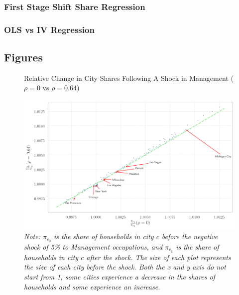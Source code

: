 \documentclass[10pt]{article}
\begin{document}
\subsubsection{First Stage Shift Share Regression}


\newpage

\subsubsection{OLS vs IV Regression}


\newpage

\subsection{Figures}

\begin{figure}[!htb]
    \centering
    \caption{Relative Change in City Shares Following A Shock in Management ($\rho = 0$ vs $\rho = 0.64$)}
    \includegraphics[width=\textwidth]{../../estimations/graphs/occ_shock.png}
    \caption*{\small\textit{Note: $\pi_{c_0}$ is the share of households in city $c$ before the negative shock of 5\% to Management occupations, and $\pi_{c_1}$ is the share of households in city $c$ after the shock. The size of each plot represents the size of each city before the shock. Both the x and y axis do not start from 1, some cities experience a decrease in the shares of households and some experience an increase.}}
\end{figure}
\end{document}
